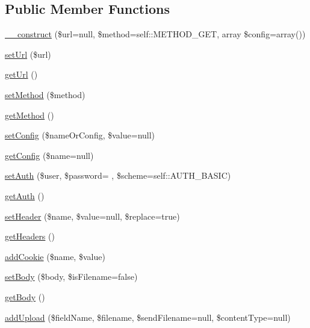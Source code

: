 \subsection*{Public Member Functions}
\begin{DoxyCompactItemize}
\item 
\hyperlink{classHTTP__Request2_a8dbfb11ace471827bd83792df59ded9f}{\+\_\+\+\_\+construct} (\$url=null, \$method=self\+::\+M\+E\+T\+H\+O\+D\+\_\+\+G\+E\+T, array \$config=array())
\item 
\hyperlink{classHTTP__Request2_a323cb019d1cb621ec9419941d42130d1}{set\+Url} (\$url)
\item 
\hyperlink{classHTTP__Request2_a35d9ef6e266d90ad52a5037b70850694}{get\+Url} ()
\item 
\hyperlink{classHTTP__Request2_a3372c369ddc092061cc15ff2f80a859f}{set\+Method} (\$method)
\item 
\hyperlink{classHTTP__Request2_a1a362b64dbeeb0321b55df04c6f2c820}{get\+Method} ()
\item 
\hyperlink{classHTTP__Request2_a57145f6158a2af444b1f7b3f38bcd0c9}{set\+Config} (\$name\+Or\+Config, \$value=null)
\item 
\hyperlink{classHTTP__Request2_a420485bbf5cc4a95399fe01138fe6ce6}{get\+Config} (\$name=null)
\item 
\hyperlink{classHTTP__Request2_a3ed0781251e632a15aadaaff960ec854}{set\+Auth} (\$user, \$password= \textquotesingle{}\textquotesingle{}, \$scheme=self\+::\+A\+U\+T\+H\+\_\+\+B\+A\+S\+I\+C)
\item 
\hyperlink{classHTTP__Request2_a92573cc9573e255bd2a9fe476153898f}{get\+Auth} ()
\item 
\hyperlink{classHTTP__Request2_adbdceb126835d75826cc461c27d27b14}{set\+Header} (\$name, \$value=null, \$replace=true)
\item 
\hyperlink{classHTTP__Request2_a49ae39a8a6531b205b15496e42b994cf}{get\+Headers} ()
\item 
\hyperlink{classHTTP__Request2_aeb8d7d755804ae328a7941be4d56aff7}{add\+Cookie} (\$name, \$value)
\item 
\hyperlink{classHTTP__Request2_acff40db54d3829648859a2832f93a004}{set\+Body} (\$body, \$is\+Filename=false)
\item 
\hyperlink{classHTTP__Request2_a206f758763ed28dce4341babf5c932d0}{get\+Body} ()
\item 
\hyperlink{classHTTP__Request2_ac8e89d3a20ba389c4781f1e5adf58e04}{add\+Upload} (\$field\+Name, \$filename, \$send\+Filename=null, \$content\+Type=null)
\item 

\end{DoxyCompactItemize}
